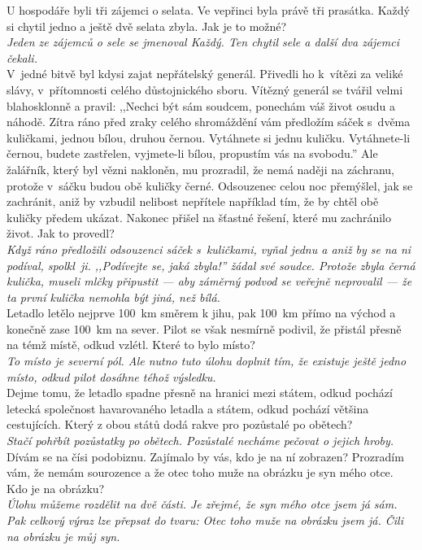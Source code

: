 \begin{multicols}{2}
\noindent
U hospodáře byli tři zájemci o selata. Ve vepřinci byla
právě tři prasátka. Každý si chytil jedno a ještě dvě selata
zbyla. Jak je to možné?\\[1 mm]
{\sl Jeden ze zájemců o sele se jmenoval Každý. Ten chytil sele
a další dva zájemci čekali.}\\

\noindent
V~jedné bitvě byl kdysi zajat nepřátelský generál. Přivedli ho
k~vítězi za veliké slávy, v~přítomnosti celého důstojnického sboru.
Vítězný generál se tvářil velmi blahosklonně a pravil: ,,Nechci být
sám soudcem, ponechám váš život osudu a náhodě. Zítra ráno před
zraky celého shromáždění vám předložím sáček s~dvěma kuličkami,
jednou bílou, druhou černou. Vytáhnete si jednu kuličku. Vytáhnete-li
černou, budete zastřelen, vyjmete-li bílou, propustím vás na svobodu.''
Ale žalářník, který byl vězni nakloněn, mu prozradil, že nemá naději
na záchranu, protože v~sáčku budou obě kuličky černé. Odsouzenec
celou noc přemýšlel, jak se zachránit, aniž by vzbudil nelibost
nepřítele například tím, že by chtěl obě kuličky předem ukázat.
Nakonec přišel na šťastné řešení, které mu zachránilo život.
Jak to provedl?\\[1 mm]
{\sl Když ráno předložili odsouzenci sáček s~kuličkami, vyňal jednu
a aniž by se na ni podíval, spolkl~ji. ,,Podívejte se, jaká zbyla!''
žádal své soudce. Protože zbyla černá kulička, museli mlčky
připustit --- aby záměrný podvod se veřejně neprovalil --- že ta
první kulička nemohla být jiná, než bílá.}\\

\noindent
Letadlo letělo nejprve 100~km směrem k jihu, pak 100~km přímo na
východ a konečně zase 100~km na sever. Pilot se však nesmírně
podivil, že přistál přesně na témž místě, odkud vzlétl.
Které to bylo místo?\\[1 mm]
{\sl To místo je severní pól. Ale nutno tuto úlohu doplnit tím,
že existuje ještě jedno místo, odkud pilot dosáhne téhož
výsledku.}\\

\noindent
Dejme tomu, že letadlo spadne přesně na hranici mezi státem,
odkud pochází letecká společnost havarovaného letadla a
státem, odkud pochází většina cestujících. Který z obou států
dodá rakve pro pozůstalé po obětech?\\[1 mm]
{\sl Stačí pohřbít pozůstatky po obětech. Pozůstalé necháme
pečovat o jejich hroby.}\\

\noindent
Dívám se na čísi podobiznu. Zajímalo by vás, kdo je na ní
zobrazen? Prozradím vám, že nemám sourozence a že otec toho
muže na obrázku je syn mého otce. Kdo je na obrázku?\\[1 mm]
{\sl Úlohu můžeme rozdělit na dvě části. Je zřejmé, že syn mého
otce jsem já sám. Pak celkový výraz lze přepsat do tvaru: Otec
toho muže na obrázku jsem já. Čili na obrázku je můj syn.}\\


\end{multicols}
